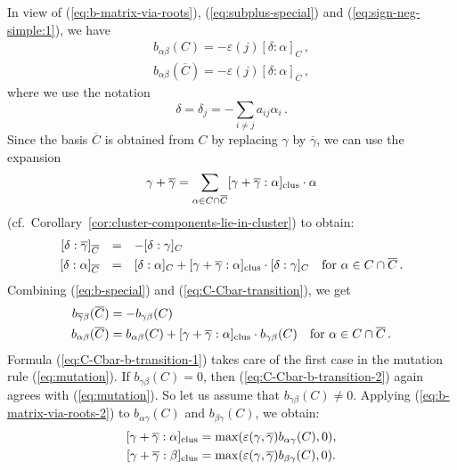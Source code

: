 \documentclass[letterpaper]{amsart}
\numberwithin{equation}{section}
\theoremstyle{definition}
\begin{document}
In view of (\ref{eq:b-matrix-via-roots}), (\ref{eq:subplus-special}) 
and (\ref{eq:sign-neg-simple:1}), we have 
\begin{equation} 
\label{eq:b-special} 
\begin{array}{l} 
b_{\alpha \beta}(C) = - \varepsilon(j) [\delta : \alpha]_C\,, \\[.05in] 
b_{\alpha \beta}(\overline C) = 
- \varepsilon(j) [\delta : \alpha]_{\overline C}\,, 
\end{array} 
\end{equation} 
where we use the notation 
\[ 
\delta = \delta_j = - \textstyle\sum_{i \neq j} a_{ij} \alpha_i \,. 
\] 
Since the basis $\overline C$ is obtained from $C$ by replacing 
$\gamma$ by $\overline \gamma$, we can use the expansion 
\[ 
\gamma + \overline \gamma = 
\sum_{\alpha \in C \cap \overline C} 
[\gamma + \overline \gamma : \alpha]_{\rm clus} \cdot  \alpha 
\] 
(cf.\  Corollary~\ref{cor:cluster-components-lie-in-cluster}) 
to obtain: 
\begin{equation} 
\label{eq:C-Cbar-transition} 
\begin{array}{rcl} 
[\delta : \overline \gamma]_{\overline C} &=& 
-[\delta : \gamma]_{C} \\[.05in] 
[\delta : \alpha]_{\overline C} &=& [\delta : \alpha]_{C} 
+ [\gamma + \overline \gamma : \alpha]_{\rm clus} 
\cdot [\delta : \gamma]_{C} \,\, \text{\ \ for 
$\alpha \in C \cap \overline C$} \,. 
\end{array} 
\end{equation} 
Combining (\ref{eq:b-special}) and (\ref{eq:C-Cbar-transition}), we get 
\begin{align} 
\label{eq:C-Cbar-b-transition-1} 
b_{\overline \gamma \beta}(\overline C) &= 
- b_{\gamma \beta}(C) \\ %
\label{eq:C-Cbar-b-transition-2} 
b_{\alpha \beta}(\overline C) &= b_{\alpha \beta}(C) 
+ [\gamma + \overline \gamma : \alpha]_{\rm clus} 
\cdot b_{\gamma \beta}(C) \,\, \text{\ \ for 
$\alpha \in C \cap \overline C$} \,. 
\end{align} 
Formula (\ref{eq:C-Cbar-b-transition-1}) takes care of 
the first case in the mutation rule (\ref{eq:mutation}). 
If $b_{\gamma \beta}(C) = 0$, then 
(\ref{eq:C-Cbar-b-transition-2}) again agrees with (\ref{eq:mutation}). 
So let us assume that $b_{\gamma \beta}(C) \neq 0$. 
Applying 
(\ref{eq:b-matrix-via-roots-2}) to $b_{\alpha \gamma} (C)$ 
and $b_{\beta \gamma} (C)$, we obtain: 
\begin{align} 
\label{eq:coeff-of-alpha-in-gamma+gamma} 
[\gamma + \overline \gamma : \alpha]_{\rm clus} &= 
\max(\varepsilon(\gamma, \overline \gamma)b_{\alpha \gamma} (C), 0), 
\\ %
\label{eq:coeff-of-beta-in-gamma+gamma} 
[\gamma + \overline \gamma : \beta]_{\rm clus} &= 
\max(\varepsilon(\gamma, \overline \gamma)b_{\beta \gamma} (C), 0). 
\end{align} 
\end{document}
